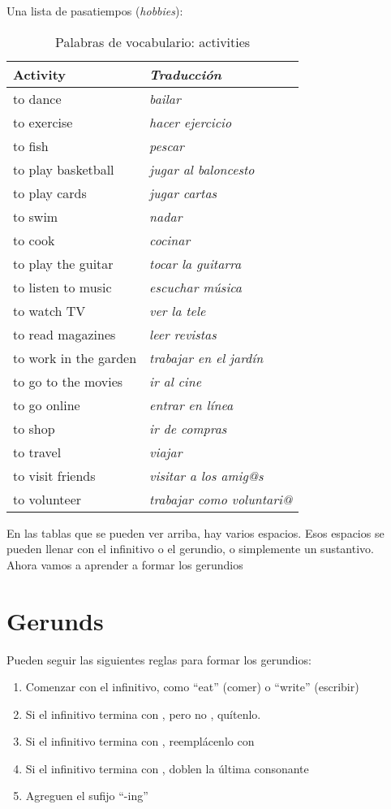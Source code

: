 Una lista de pasatiempos (\emph{hobbies}):
\begin{table}[H]
	\centering
	\begin{tabular}{ll}
	\toprule
		\textbf{Activity} & \textbf{\emph{Traducci\'on}} \\
	\midrule
		to dance & \emph{bailar} \\
		to exercise & \emph{hacer ejercicio}  \\
		to fish & \emph{pescar} \\
		to play basketball & \emph{jugar al baloncesto} \\
		to play cards & \emph{jugar cartas} \\
		to swim & \emph{nadar} \\
		to cook & \emph{cocinar} \\
		to play the guitar & \emph{tocar la guitarra} \\
		to listen to music & \emph{escuchar música} \\
		to watch TV & \emph{ver la tele} \\
		to read magazines & \emph{leer revistas} \\
		to work in the garden & \emph{trabajar en el jardín} \\
		to go to the movies & \emph{ir al cine} \\
		to go online & \emph{entrar en línea} \\
		to shop & \emph{ir de compras} \\
		to travel & \emph{viajar} \\
		to visit friends & \emph{visitar a los amig@s} \\
		to volunteer & \emph{trabajar como voluntari@} \\
	\bottomrule
	\end{tabular}
	\caption{Palabras de vocabulario: activities}
\end{table}

En las tablas que se pueden ver arriba, hay varios espacios.
Esos espacios se pueden llenar con el infinitivo o el gerundio, o simplemente un sustantivo. \\

Ahora vamos a aprender a formar los gerundios
\section{Gerunds}

Pueden seguir las siguientes reglas para formar los gerundios:
\begin{enumerate}[noitemsep]
	\item Comenzar con el infinitivo, como ``eat'' (comer) o ``write'' (escribir)
	\item Si el infinitivo termina con , pero no , quítenlo.
	\item Si el infinitivo termina con , reemplácenlo con 
	\item Si el infinitivo termina con , doblen la última consonante
	\item Agreguen el sufijo ``-ing''
\end{enumerate}

